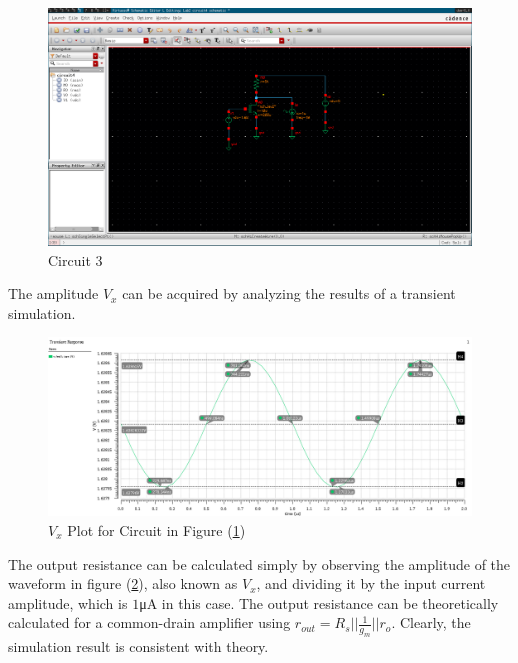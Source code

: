 \FloatBarrier

\begin{figure}[h!]
	\centering
	\includegraphics[scale=0.30]{./images/circuit4.PNG}
	\caption{Circuit 3}
	\label{fig:circuit3}
\end{figure}

\FloatBarrier
The amplitude $V_{x}$ can be acquired by analyzing the results of a transient simulation.

\FloatBarrier

\begin{figure}[h!]
	\centering
	\includegraphics[scale=0.45]{./images/sim3_vx.PNG}
	\caption{$V_{x}$ Plot for Circuit in Figure (\ref{fig:circuit3})}
	\label{fig:sim3_vx}
\end{figure}

\FloatBarrier

The output resistance can be calculated simply by observing the amplitude of the waveform in figure (\ref{fig:sim3_vx}), also known as $V_{x}$, and dividing it by the input current amplitude, which is $1$\si{\micro\ampere} in this case.
The output resistance can be theoretically calculated for a common-drain amplifier using $r_{out} = R_{s} || \frac{1}{g_{m}} || r_{o}$.
Clearly, the simulation result is consistent with theory.

